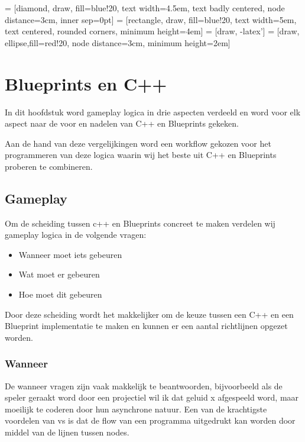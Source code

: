 \lstset {language=C++}
 = [diamond, draw, fill=blue!20, 
    text width=4.5em, text badly centered, node distance=3cm, inner sep=0pt]
 = [rectangle, draw, fill=blue!20, 
    text width=5em, text centered, rounded corners, minimum height=4em]
 = [draw, -latex']
 = [draw, ellipse,fill=red!20, node distance=3cm,
    minimum height=2em]

\chapter{Blueprints en C++}
\label{ch:BlueprintsEnCpp}

In dit hoofdstuk word gameplay logica in drie aspecten verdeeld en word voor elk aspect naar de voor en nadelen van C++ en Blueprints gekeken.

Aan de hand van deze vergelijkingen word een workflow gekozen voor het programmeren van deze logica waarin wij het beste uit C++ en Blueprints proberen te combineren.

\section{Gameplay}

Om de scheiding tussen c++ en Blueprints concreet te maken verdelen wij gameplay logica in de volgende vragen:

\begin{itemize}
	\item Wanneer moet iets gebeuren
	\item Wat moet er gebeuren
	\item Hoe moet dit gebeuren
\end{itemize}

Door deze scheiding wordt het makkelijker om de keuze tussen een C++ en een Blueprint implementatie te maken en kunnen er een aantal richtlijnen opgezet worden.

\subsection{Wanneer}
De wanneer vragen zijn vaak makkelijk te beantwoorden, bijvoorbeeld als de speler geraakt word door een projectiel wil ik dat geluid x afgespeeld word, maar moeilijk te coderen door hun asynchrone natuur. Een van de krachtigste voordelen van \gls{vs} is dat de flow van een programma uitgedrukt kan worden door middel van de lijnen tussen nodes. 

